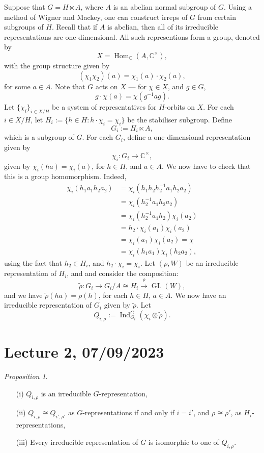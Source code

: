 \documentclass[a4paper]{report}
\theoremstyle{definition}
\theoremstyle{remark}
\theoremstyle{proposition}
\newtheorem{proposition}{Proposition}
\theoremstyle{conjecture}
\theoremstyle{lemma}
\theoremstyle{corollary}
\theoremstyle{exercise}
\theoremstyle{example}
\newcommand{\C}{\mathbb{C}}
\newcommand{\on}{\operatorname}
\begin{document}
Suppose that $G = H\ltimes A$, where $A$ is an abelian normal subgroup of $G$.
Using a method of Wigner and Mackey, one can construct irreps 
of $G$ from certain subgroups of $H$.
Recall that if $A$ is abelian, then all of its irreducible representations
are one-dimensional. All such representions form a group, denoted by 
$$X = \on{Hom}_\C(A,\C^\times),$$
with the group structure given by 
$$(\chi_1\chi_2)(a) = \chi_1(a)\cdot \chi_2(a),$$
for some $a\in A$.
Note that $G$ acts on $X$ --- for $\chi \in X$, and $g\in G$,
$$g\cdot \chi(a) = \chi(g^{-1}ag).$$
Let $\lbrace \chi_i\rbrace_{i\in X/H}$ be a system of representatives 
for $H$-orbits on $X$. For each $i\in X/H$, let $H_i := \lbrace h\in H:h\cdot \chi_i = \chi_i\rbrace$ be the stabiliser subgroup.
Define $$G_i:= H_i \ltimes A,$$ which is a subgroup of $G$.
For each $G_i$, define a one-dimensional representation given by 
$$\chi_i : G_i \to \C^\times,$$ given by $\chi_i(ha) = \chi_i(a)$,
for $h\in H$, and $a\in A$. We now have to check that this is a group
homomorphism. Indeed,
\begin{align*}
    \chi_i(h_1a_1h_2a_2) &= \chi_i(h_1h_2h_2^{-1}a_1h_2a_2)\\ 
                         &= \chi_i(h_2^{-1}a_1h_2a_2)\\ 
                         &= \chi_i(h_2^{-1}a_1h_2)\chi_i(a_2)\\ 
                         &= h_2\cdot\chi_i(a_1)\chi_i(a_2)\\ 
                         &= \chi_i(a_1)\chi_i(a_2) = \chi\\ 
                         &= \chi_i(h_1a_1)\chi_i(h_2a_2),
\end{align*}
using the fact that $h_2\in H_i$, and $h_2\cdot\chi_i = \chi_i$.
Let $(\rho,W)$ be an irreducible representation of $H_i$, and and consider
the composition:
$$\widetilde{\rho} : G_i \longrightarrow G_i/A \cong H_i \stackrel{\rho}{\longrightarrow} \on{GL}(W),$$
and we have $\widetilde{\rho}(ha) =\rho(h)$, for each $h\in H$, $a\in A$.
We now have an irreducible representation of $G_i$ given by $\widetilde{\rho}$.
Let $$Q_{i,\rho}:= \on{Ind}_{G_i}^G (\chi_i\otimes \widetilde{\rho}).$$

\section{Lecture 2, 07/09/2023}

\begin{proposition}
    \leavevmode
    \begin{itemize}
        \item[(i)] $Q_{i,\rho}$ is an irreducible $G$-representation,
        \item[(ii)] $Q_{i,\rho} \cong Q_{i',\rho'}$ as $G$-representations
            if and only if
            $i=i'$, and $\rho \cong \rho'$, as $H_i$-representations,
        \item[(iii)] Every irreducible representation of $G$ is isomorphic
            to one of $Q_{i,\rho}$.
    \end{itemize}
\end{proposition}
\end{document}
